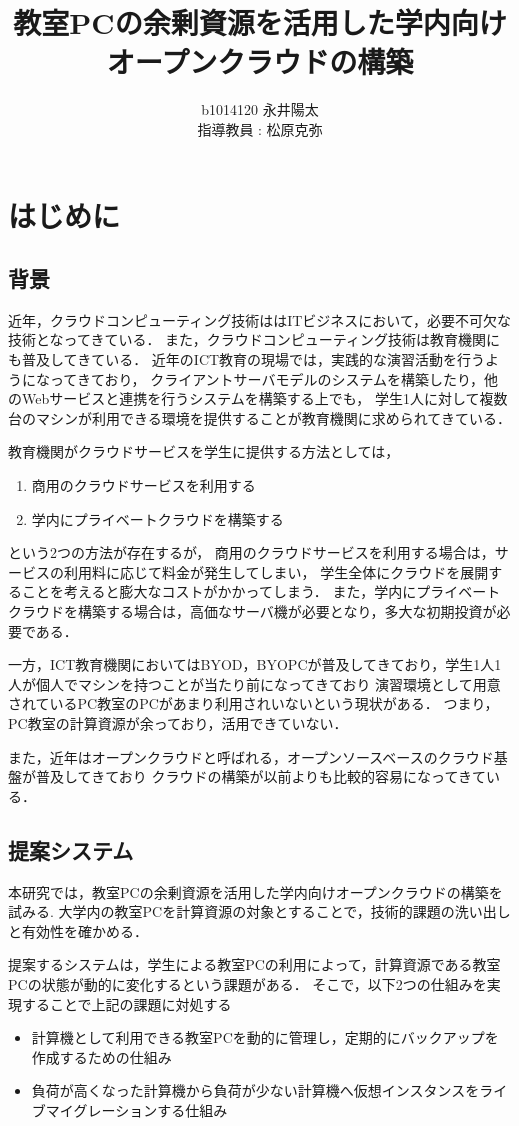 \documentclass[11pt,a4paper]{jsarticle}
\author{%
b1014120 永井陽太\\指導教員 : 松原克弥
}
\title{教室PCの余剰資源を活用した学内向けオープンクラウドの構築}
\begin{document}
\maketitle

\section{はじめに}

\subsection{背景}
近年，クラウドコンピューティング技術ははITビジネスにおいて，必要不可欠な技術となってきている．
また，クラウドコンピューティング技術は教育機関にも普及してきている．
近年のICT教育の現場では，実践的な演習活動を行うようになってきており，
クライアントサーバモデルのシステムを構築したり，他のWebサービスと連携を行うシステムを構築する上でも，
学生1人に対して複数台のマシンが利用できる環境を提供することが教育機関に求められてきている．
\par 教育機関がクラウドサービスを学生に提供する方法としては，
\begin{enumerate}
	\item 商用のクラウドサービスを利用する
	\item 学内にプライベートクラウドを構築する
\end{enumerate}
という2つの方法が存在するが，
商用のクラウドサービスを利用する場合は，サービスの利用料に応じて料金が発生してしまい，
学生全体にクラウドを展開することを考えると膨大なコストがかかってしまう．
また，学内にプライベートクラウドを構築する場合は，高価なサーバ機が必要となり，多大な初期投資が必要である．
\par 一方，ICT教育機関においてはBYOD，BYOPCが普及してきており，学生1人1人が個人でマシンを持つことが当たり前になってきており
演習環境として用意されているPC教室のPCがあまり利用されいないという現状がある．
つまり，PC教室の計算資源が余っており，活用できていない．
\par また，近年はオープンクラウドと呼ばれる，オープンソースベースのクラウド基盤が普及してきており
クラウドの構築が以前よりも比較的容易になってきている．

\subsection{提案システム}
本研究では，教室PCの余剰資源を活用した学内向けオープンクラウドの構築を試みる.
大学内の教室PCを計算資源の対象とすることで，技術的課題の洗い出しと有効性を確かめる．
\par 提案するシステムは，学生による教室PCの利用によって，計算資源である教室PCの状態が動的に変化するという課題がある．
そこで，以下2つの仕組みを実現することで上記の課題に対処する
\begin{itemize}
	\item 計算機として利用できる教室PCを動的に管理し，定期的にバックアップを作成するための仕組み
	\item 負荷が高くなった計算機から負荷が少ない計算機へ仮想インスタンスをライブマイグレーションする仕組み
\end{itemize}
\end{document}
